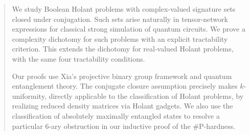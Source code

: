 
\begin{abstract}
 We study Boolean Holant problems with complex-valued signature sets closed under conjugation. Such sets arise naturally in tensor-network expressions for classical strong simulation of quantum circuits. We prove a complexity dichotomy for such problems with an explicit tractability criterion. This extends the dichotomy for real-valued Holant problems, with the same four tractability conditions.


Our proofs use Xia's projective binary group framework and quantum entanglement theory.
The conjugate closure assumption precisely makes $k$-uniformity, directly applicable
to the classification of Holant problems, by realizing reduced density matrices via Holant gadgets. 
We also use the classification of absolutely maximally entangled states to resolve a particular $6$-ary obstruction in our
inductive proof of the \#P-hardness. 

\end{abstract}

